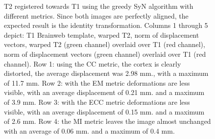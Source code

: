 \begin{figure}[H]
\centering
{}
\caption{T2 registered towards T1 using the greedy SyN algorithm with different metrics. Since both images are perfectly aligned, the expected result is the identity transformation.
Columns 1 through 5 depict: T1 Brainweb template, warped T2, norm of displacement vectors, warped T2 (green channel) overlaid over T1 (red channel), norm of displacement vectors
(green channel) overlaid over T1 (red channel). Row 1: using the CC metric, the cortex is clearly distorted, the average displacement was 2.98 mm., with a maximum of 11.7 mm.
Row 2: with the EM metric deformations are less visible, with an average displacement of 0.21 mm. and a maximum of 3.9 mm.
Row 3: with the ECC metric deformations are less visible, with an average displacement of 0.15 mm. and a maximum of 2.6 mm. Row 4: the MI metric leaves the image almost unchanged
with an average of 0.06 mm. and a maximum of 0.4 mm.}
\label{fig:t1_t2_reg_pannel}
\end{figure}



